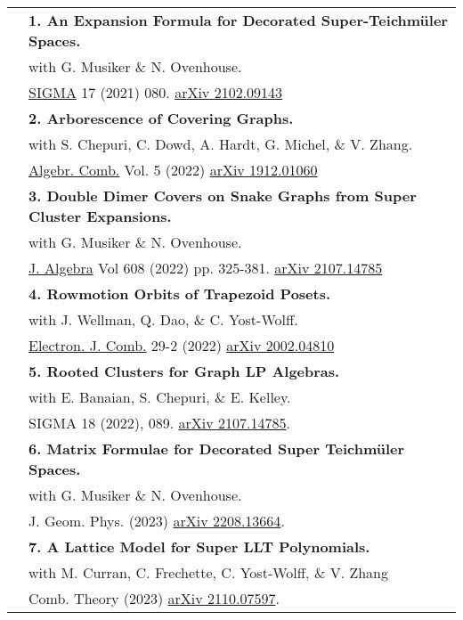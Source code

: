 \documentclass[letterpaper, 11pt,times]{article}
\newcommand{\mycolor}[0]{\color{RoyalBlue}}
\newlength{\myl}
\newcommand{\ind}[0]{\hspace{\myl}}
\newlength{\newl}
\newcommand{\paper}[2]{
\settowidth{\newl}{\textbf{#1. \ }}
\noindent
\hspace{\dimexpr\myl - \newl}
\textbf{#1. #2}
}
\begin{document}
\begin{longtable}{p{1in}p{5in}}
\nohyphens{\mycolor{Publications}} 
&\paper{1}{An Expansion Formula for Decorated Super-Teichm\"uler Spaces.} \\
&\ind  with  G. Musiker \& N. Ovenhouse. \\
&\ind  \href{https://doi.org/10.3842/SIGMA.2021.080}{SIGMA} {17} (2021) 080. \href{https://arxiv.org/abs/2102.09143}{arXiv 2102.09143}\\

&\paper{2}{Arborescence of Covering Graphs.} \\
&\ind  with S. Chepuri, C. Dowd, A. Hardt, G. Michel, \& V. Zhang.\\
&\ind     \href{https://doi.org/10.5802/alco.212}{Algebr. Comb.} Vol. 5 (2022) \href{https://arxiv.org/abs/1912.01060}{arXiv 1912.01060}\\

&\paper{3}{Double Dimer Covers on Snake Graphs from Super Cluster Expansions.}\\
&\ind  with G. Musiker \& N. Ovenhouse.\\
&\ind  \href{https://doi.org/10.1016/j.jalgebra.2022.05.033}{J. Algebra} Vol 608 (2022) pp. 325-381. \href{https://arxiv.org/abs/2107.14785}{arXiv 2107.14785}\\

&\paper{4}{Rowmotion Orbits of Trapezoid Posets.}\\
&\ind  with J. Wellman, Q. Dao, \& C. Yost-Wolff.\\
&\ind   \href{https://doi.org/10.37236/9769}{Electron. J. Comb.} 29-2 (2022) \href{https://arxiv.org/abs/2002.04810}{arXiv 2002.04810}\\

&\paper{5}{Rooted Clusters for Graph LP Algebras.}\\
&\ind  with E. Banaian, S. Chepuri, \& E. Kelley.\\
&\ind SIGMA 18 (2022), 089. \href{https://arxiv.org/abs/2107.14785}{arXiv 2107.14785}. \\

&\paper{6}{Matrix Formulae for Decorated Super Teichm\"uler Spaces.} \\
&\ind  with  G. Musiker \& N. Ovenhouse. \\
&\ind  J. Geom. Phys. (2023) \href{https://arxiv.org/abs/2208.13664}{arXiv 2208.13664}. \\

&\paper{7}{A Lattice Model for Super LLT Polynomials.} \\
&\ind  with M. Curran, C. Frechette, C. Yost-Wolff, \& V. Zhang\\
&\ind  Comb. Theory (2023) \href{https://arxiv.org/abs/2110.07597}{arXiv 2110.07597}. \\


\end{longtable}
\end{document}
